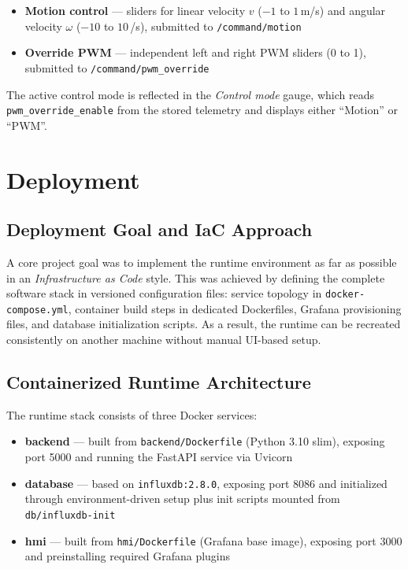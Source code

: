 \documentclass[a4paper,11pt]{article}
\begin{document}
\begin{itemize}
    \item \textbf{Motion control} --- sliders for linear velocity $v$
    ($-1$ to $1$\,m/s) and angular velocity $\omega$ ($-10$ to $10$\,\textdegree{}/s), submitted
    to \texttt{/command/motion}
    \item \textbf{Override PWM} --- independent left and right PWM sliders (0 to 1), submitted to
    \texttt{/command/pwm\_override}
\end{itemize}

The active control mode is reflected in the \emph{Control mode} gauge, which reads
\texttt{pwm\_override\_enable} from the stored telemetry and displays either ``Motion'' or ``PWM''.

\section{Deployment}
\label{sec:deployment}

\subsection{Deployment Goal and IaC Approach}

A core project goal was to implement the runtime environment as far as possible in an
\textit{Infrastructure as Code} style. This was achieved by defining the complete software stack in
versioned configuration files: service topology in \texttt{docker-compose.yml}, container build
steps in dedicated Dockerfiles, Grafana provisioning files, and database initialization scripts.
As a result, the runtime can be recreated consistently on another machine without manual UI-based
setup.

\subsection{Containerized Runtime Architecture}

The runtime stack consists of three Docker services:

\begin{itemize}
    \item \textbf{backend} --- built from \texttt{backend/Dockerfile} (Python 3.10 slim), exposing
    port 5000 and running the FastAPI service via Uvicorn
    \item \textbf{database} --- based on \texttt{influxdb:2.8.0}, exposing port 8086 and initialized
    through environment-driven setup plus init scripts mounted from \texttt{db/influxdb-init}
    \item \textbf{hmi} --- built from \texttt{hmi/Dockerfile} (Grafana base image), exposing port
    3000 and preinstalling required Grafana plugins
\end{itemize}
\end{document}
